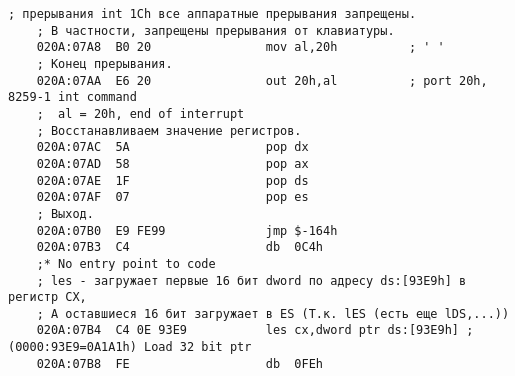 \documentclass[12pt,a4paper]{report}
\begin{document}
\begin{lstlisting}[label=some-code,caption=Код прерывания INT 8h]
    ; прерывания int 1Ch все аппаратные прерывания запрещены.
    ; В частности, запрещены прерывания от клавиатуры.
    020A:07A8  B0 20				mov	al,20h			; ' '
    ; Конец прерывания.
    020A:07AA  E6 20				out	20h,al			; port 20h, 8259-1 int command
    ;  al = 20h, end of interrupt
    ; Восстанавливаем значение регистров. 
    020A:07AC  5A					pop	dx
    020A:07AD  58					pop	ax
    020A:07AE  1F					pop	ds
    020A:07AF  07					pop	es
    ; Выход.
    020A:07B0  E9 FE99				jmp	$-164h
    020A:07B3  C4					db	0C4h
    ;* No entry point to code
    ; les - загружает первые 16 бит dword по адресу ds:[93E9h] в регистр CX,
    ; А оставшиеся 16 бит загружает в ES (Т.к. lES (есть еще lDS,...))
    020A:07B4  C4 0E 93E9			les	cx,dword ptr ds:[93E9h]	; (0000:93E9=0A1A1h) Load 32 bit ptr
    020A:07B8  FE					db	0FEh
    \end{lstlisting}
    
\end{document}
